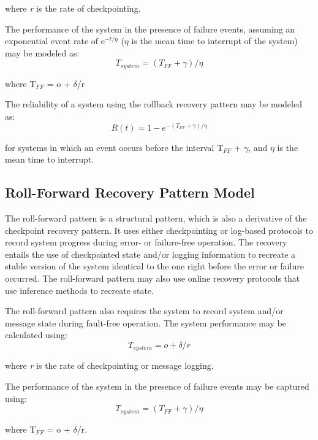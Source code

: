 where \textit{r} is the rate of checkpointing.

The performance of the system in the presence of failure events, assuming an exponential event rate of e$^{-t/\eta}$ ($\eta$ is the mean time to interrupt of the system) may be modeled as: 
\begin{equation}
T_{system} = (T_{FF} + \gamma)/\eta 
\label{eq:cr2}
\end{equation}

where T$_{FF}$ = o + $\delta$/r

The reliability of a system using the rollback recovery pattern may be modeled as: 
\begin{equation}
R(t) = 1 -  e^{-(T_{FF} + \gamma)/\eta} 
\label{eq:cr3}
\end{equation}

for systems in which an event occurs before the interval T$_{FF}$ + $\gamma$, and $\eta$ is the mean time to interrupt.

\subsection{Roll-Forward Recovery Pattern Model}
The roll-forward pattern is a structural pattern, which is also a derivative of the checkpoint recovery pattern. It uses either checkpointing or log-based protocols to record system progress during error- or failure-free operation. The recovery entails the use of checkpointed state and/or logging information to recreate a stable version of the system identical to the one right before the error or failure occurred. The roll-forward pattern may also use online recovery protocols that use inference methods to recreate state.

The roll-forward pattern also requires the system to record system and/or message state during fault-free operation. The system performance may be calculated using: 
\begin{equation}
T_{system} = o + \delta/r
\label{eq:rf1}
\end{equation}

where \textit{r} is the rate of checkpointing or message logging.

The performance of the system in the presence of failure events may be captured using: 
\begin{equation}
T_{system} = (T_{FF} + \gamma)/\eta 
\label{eq:rf2}
\end{equation}

where T$_{FF}$ = o + $\delta$/r.

